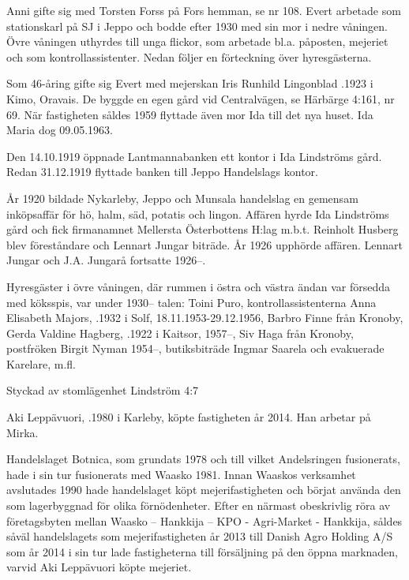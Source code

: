 Anni gifte sig med Torsten Forss på Fors hemman, se nr 108. Evert arbetade som stationskarl på SJ i Jeppo och bodde efter 1930 med sin mor i nedre våningen. Övre våningen uthyrdes till unga flickor, som arbetade bl.a. påposten, mejeriet och som kontrollassistenter. Nedan följer en förteckning över hyresgästerna.

Som 46-åring gifte sig Evert med mejerskan Iris Runhild Lingonblad .1923 i Kimo, Oravais. De byggde en egen gård vid Centralvägen, se Härbärge 4:161, nr 69. När fastigheten såldes 1959 flyttade även mor Ida till det nya huset. Ida Maria dog 09.05.1963.

Den 14.10.1919 öppnade Lantmannabanken ett kontor i Ida Lindströms gård. Redan 31.12.1919 flyttade banken till Jeppo Handelslags kontor.

År 1920 bildade Nykarleby, Jeppo och Munsala handelslag en gemensam inköpsaffär för hö, halm, säd, potatis och lingon. Affären hyrde Ida Lindströms gård och fick firmanamnet Mellersta Österbottens H:lag m.b.t. Reinholt Husberg blev föreståndare och Lennart Jungar biträde. År 1926 upphörde affären. Lennart Jungar och J.A. Jungarå fortsatte 1926--.

Hyresgäster i övre våningen, där rummen i östra och västra ändan var försedda med köksspis, var under 1930-- talen:
Toini Puro, kontrollassistenterna Anna Elisabeth Majors, .1932 i Solf, 18.11.1953-29.12.1956, Barbro Finne från Kronoby, Gerda Valdine Hagberg, .1922 i Kaitsor, 1957--, Siv Haga från Kronoby, postfröken Birgit Nyman 1954--, butiksbiträde Ingmar Saarela och evakuerade Karelare, m.fl.




Styckad av stomlägenhet Lindström 4:7


Aki Leppävuori, .1980 i Karleby, köpte fastigheten år 2014. Han arbetar på Mirka.\jhvspace{}


Handelslaget Botnica, som grundats 1978 och till vilket Andelsringen fusionerats, hade i sin tur fusionerats med Waasko 1981. Innan Waaskos verksamhet avslutades 1990 hade handelslaget köpt mejerifastigheten och börjat använda den som lagerbyggnad för olika förnödenheter. Efter en närmast obeskrivlig röra av företagsbyten mellan Waasko – Hankkija – KPO - Agri-Market - Hankkija, såldes såväl handelslagets som mejerifastigheten år 2013 till Danish Agro Holding A/S som år 2014 i sin tur lade fastigheterna till försäljning på den öppna marknaden, varvid Aki Leppävuori köpte mejeriet.

